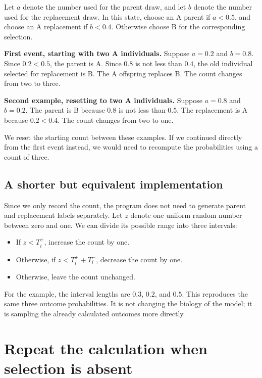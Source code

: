 Let \(a\) denote the number used for the parent draw, and let \(b\) denote
the number used for the replacement draw. In this state, choose an A parent
if \(a<0.5\), and choose an A replacement if \(b<0.4\). Otherwise choose B
for the corresponding selection.

\begin{workedexample}
\textbf{First event, starting with two A individuals.} Suppose \(a=0.2\)
and \(b=0.8\). Since \(0.2<0.5\), the parent is A. Since \(0.8\) is not
less than \(0.4\), the old individual selected for replacement is B.
The A offspring replaces B. The count changes from two to three.

\textbf{Second example, resetting to two A individuals.} Suppose \(a=0.8\)
and \(b=0.2\). The parent is B because \(0.8\) is not less than \(0.5\).
The replacement is A because \(0.2<0.4\). The count changes from two to one.

We reset the starting count between these examples. If we continued directly
from the first event instead, we would need to recompute the probabilities
using a count of three.
\end{workedexample}

\subsection{A shorter but equivalent implementation}

Since we only record the count, the program does not need to generate parent
and replacement labels separately. Let \(z\) denote one uniform random
number between zero and one. We can divide its possible range into three
intervals:
\begin{itemize}
 \item If \(z<T_i^+\), increase the count by one.
 \item Otherwise, if \(z<T_i^++T_i^-\), decrease the count by one.
 \item Otherwise, leave the count unchanged.
\end{itemize}
For the example, the interval lengths are \(0.3\), \(0.2\), and \(0.5\).
This reproduces the same three outcome probabilities. It is not changing
the biology of the model; it is sampling the already calculated outcomes
more directly.

\section{Repeat the calculation when selection is absent}

